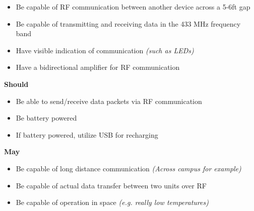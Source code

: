 \documentclass[12pt]{article}
\begin{document}
\begin{description}
\begin{itemize}
			\item{Be capable of RF communication between another device across a 5-6ft gap}
      \item{Be capable of transmitting and receiving data in the 433 MHz frequency band}
			\item{Have visible indication of communication \textit{(such as LEDs)}}
			\item{Have a bidirectional amplifier for RF communication}
		\end{itemize}
		\textbf{Should}
		\begin{itemize}
			\item{Be able to send/receive data packets via RF communication}
			\item{Be battery powered}
			\item{If battery powered, utilize USB for recharging}
		\end{itemize}
		\textbf{May}
		\begin{itemize}
			\item{Be capable of long distance communication \textit{(Across campus for example)}}
			\item{Be capable of actual data transfer between two units over RF}
			\item{Be capable of operation in space \textit{(e.g. really low temperatures)}}
		\end{itemize}
\end{description}
\end{document}
